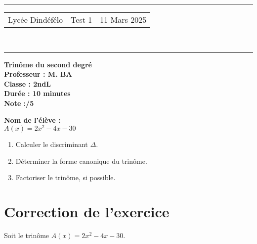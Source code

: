 \documentclass[a4paper,12pt]{article}
\begin{document}
\hrule %
\begin{center}
    \begin{tabular}{@{} p{5cm} p{5cm} p{5cm} @{}} %
        Lycée Dindéfélo & \quad\quad\quad Test 1 & 11 Mars 2025 \\
    \end{tabular}
    \\[-0.01cm] %
    \hrule %
\end{center}
\begin{center}
    \textbf{\Large Trinôme du second degré} \\[0.2cm]
    \textbf{\large Professeur : M. BA} \\[0.2cm]
    \textbf{Classe : 2ndL} \\[0.2cm]
    \textbf{\small Durée : 10 minutes} \\[0.2cm]
    \textbf{\small Note :\quad\quad /5}
\end{center}

\textbf{\small Nom de l'élève :} \underline{\hspace{8cm}} \\[0.5cm]

\( A(x) = 2x^2 - 4x - 30 \)

\begin{enumerate}
    \item Calculer le discriminant \(\Delta\).
    \item Déterminer la forme canonique du trinôme.
    \item Factoriser le trinôme, si possible.
\end{enumerate}

\section*{Correction de l'exercice}

Soit le trinôme \( A(x) = 2x^2 - 4x - 30 \).
\end{document}
